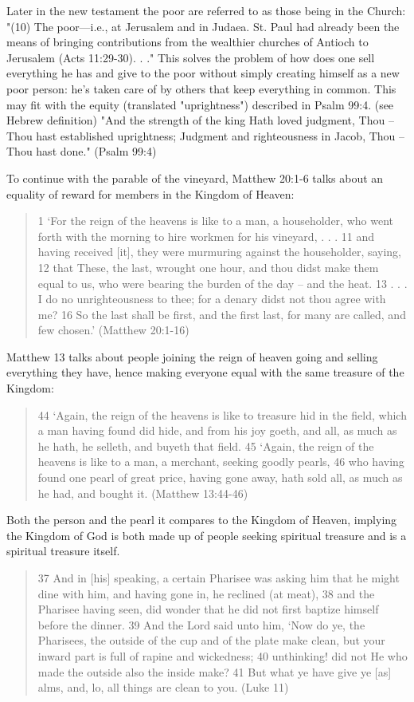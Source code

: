 \documentclass[11pt]{article}
\begin{document}
Later in the new testament the poor are referred to as those being in the Church:
"(10) The poor—i.e., at Jerusalem and in Judaea. St. Paul had already been the means of bringing contributions from the wealthier churches of Antioch to Jerusalem (Acts 11:29-30). . ." \cite{the poor} This solves the problem of how does one sell everything he has and give to the poor without simply creating himself as a new poor person: he's taken care of by others that keep everything in common. This may fit with the equity (translated "uprightness") described in Psalm 99:4. (see Hebrew definition) %
"And the strength of the king Hath loved judgment, Thou -- Thou hast established uprightness; Judgment and righteousness in Jacob, Thou -- Thou hast done." (Psalm 99:4) 

\indent To continue with the parable of the vineyard, Matthew 20:1-6 talks about an equality of reward for members in the Kingdom of Heaven:
\begin{quote}
1 `For the reign of the heavens is like to a man, a householder, who went forth with the morning to hire workmen for his vineyard, . . . 11 and having received [it], they were murmuring against the householder, saying, 12 that These, the last, wrought one hour, and thou didst make them equal to us, who were bearing the burden of the day -- and the heat. 13 . . . I do no unrighteousness to thee; for a denary didst not thou agree with me? 16 So the last shall be first, and the first last, for many are called, and few chosen.' (Matthew 20:1-16)
\end{quote}
Matthew 13 talks about people joining the reign of heaven going and selling everything they have, hence making everyone equal with the same treasure of the Kingdom:
\begin{quote}
44 `Again, the reign of the heavens is like to treasure hid in the field, which a man having found did hide, and from his joy goeth, and all, as much as he hath, he selleth, and buyeth that field. 45 `Again, the reign of the heavens is like to a man, a merchant, seeking goodly pearls, 46 who having found one pearl of great price, having gone away, hath sold all, as much as he had, and bought it. (Matthew 13:44-46)
\end{quote}
Both the person and the pearl it compares to the Kingdom of Heaven, implying the Kingdom of God is both made up of people seeking spiritual treasure and is a spiritual treasure itself. 
\begin{quote}
37 And in [his] speaking, a certain Pharisee was asking him that he might dine with him, and having gone in, he reclined (at meat),
38 and the Pharisee having seen, did wonder that he did not first baptize himself before the dinner.
39 And the Lord said unto him, `Now do ye, the Pharisees, the outside of the cup and of the plate make clean, but your inward part is full of rapine and wickedness;
40 unthinking! did not He who made the outside also the inside make?
41 But what ye have give ye [as] alms, and, lo, all things are clean to you. (Luke 11)
\end{quote}
\end{document}
